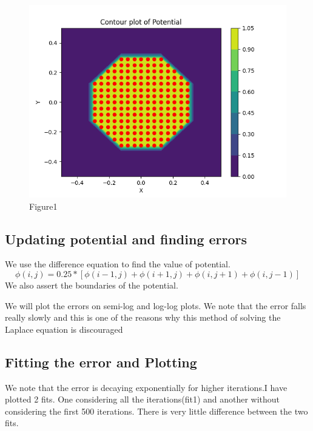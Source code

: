 \documentclass[11pt, a4paper]{article}
\begin{document}
\begin{figure}[!tbh]
\centering
\includegraphics[scale=0.45]{Assgn5_plot1.png} 
\caption{Figure1}
\label{fig1}
\end{figure}

\subsection*{Updating potential and finding errors}
We use the difference equation to find the value of potential.
\begin{equation*}
 \phi(i,j)=0.25*[\phi(i-1,j) + \phi(i+1,j) + \phi(i,j+1) + \phi(i,j-1)]
\end{equation*}
We also assert the boundaries of the potential.

We will plot the errors on semi-log and log-log plots. We note that the error
falls really slowly and this is one of the reasons why this method of solving the Laplace equation is discouraged


\subsection*{Fitting the error and Plotting }
We note that the error is decaying exponentially for higher iterations.I have
plotted 2 fits. One considering all the iterations(fit1) and another without considering the first 500 iterations. There is very little difference between the two fits.

\end{document}
